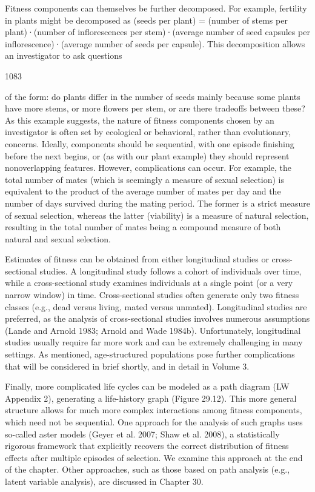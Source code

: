 \documentclass{article}
\begin{document}
Fitness components can themselves be further decomposed. For example, fertility in plants might be decomposed as (seeds per plant) = (number of stems per plant)·(number of inflorescences per stem)·(average number of seed capsules per inflorescence)·(average number of seeds per capsule). This decomposition allows an investigator to ask questions

1083

of the form: do plants differ in the number of seeds mainly because some plants have more stems, or more flowers per stem, or are there tradeoffs between these? As this example suggests, the nature of fitness components chosen by an investigator is often set by ecological or behavioral, rather than evolutionary, concerns. Ideally, components should be sequential, with one episode finishing before the next begins, or (as with our plant example) they should represent nonoverlapping features. However, complications can occur. For example, the total number of mates (which is seemingly a measure of sexual selection) is equivalent to the product of the average number of mates per day and the number of days survived during the mating period. The former is a strict measure of sexual selection, whereas the latter (viability) is a measure of natural selection, resulting in the total number of mates being a compound measure of both natural and sexual selection.

Estimates of fitness can be obtained from either longitudinal studies or cross-sectional studies. A longitudinal study follows a cohort of individuals over time, while a cross-sectional study examines individuals at a single point (or a very narrow window) in time. Cross-sectional studies often generate only two fitness classes (e.g., dead versus living, mated versus unmated). Longitudinal studies are preferred, as the analysis of cross-sectional studies involves numerous assumptions (Lande and Arnold 1983; Arnold and Wade 1984b). Unfortunately, longitudinal studies usually require far more work and can be extremely challenging in many settings. As mentioned, age-structured populations pose further complications that will be considered in brief shortly, and in detail in Volume 3.

Finally, more complicated life cycles can be modeled as a path diagram (LW Appendix 2), generating a life-history graph (Figure 29.12). This more general structure allows for much more complex interactions among fitness components, which need not be sequential. One approach for the analysis of such graphs uses so-called aster models (Geyer et al. 2007; Shaw et al. 2008), a statistically rigorous framework that explicitly recovers the correct distribution of fitness effects after multiple episodes of selection. We examine this approach at the end of the chapter. Other approaches, such as those based on path analysis (e.g., latent variable analysis), are discussed in Chapter 30.
\end{document}
